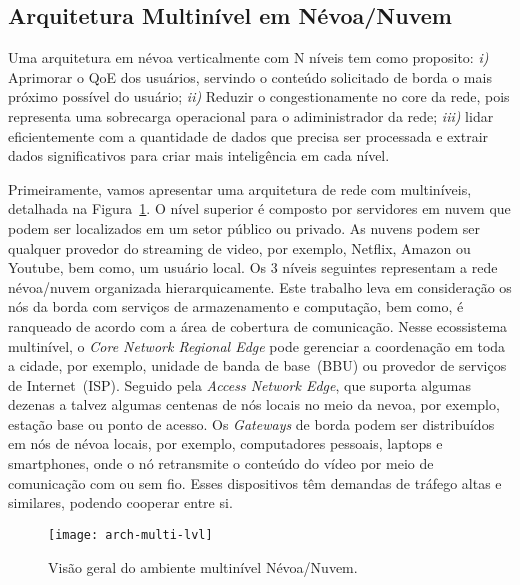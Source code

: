 \subsection{Arquitetura Multinível em Névoa/Nuvem}


Uma arquitetura em névoa verticalmente com N níveis tem como proposito: 
\textit{i)} Aprimorar o QoE dos usuários, servindo o conteúdo solicitado de borda o mais próximo possível do usuário;
\textit{ii)} Reduzir o congestionamente no core da rede, pois representa uma sobrecarga operacional para o adiministrador da rede;
\textit{iii)} lidar eficientemente com a quantidade de dados que precisa ser processada e extrair dados significativos para criar mais inteligência em cada nível. 
%

Primeiramente, vamos apresentar uma arquitetura de rede com multiníveis, detalhada na Figura~\ref{fig:arch-multi-lvl}. O nível superior é composto por servidores em nuvem que podem ser localizados em um setor público ou privado. As nuvens podem ser qualquer provedor do streaming de video, por exemplo, Netflix, Amazon ou Youtube, bem como, um usuário local. %
Os 3 níveis seguintes representam a rede névoa/nuvem organizada hierarquicamente. Este  trabalho leva em consideração os nós da borda com serviços de armazenamento e computação, bem como, é ranqueado de acordo com a área de cobertura de comunicação. Nesse ecossistema multinível, o \textit{Core Network Regional Edge} pode gerenciar a coordenação em toda a cidade, por exemplo, unidade de banda de base~(BBU) ou provedor de serviços de Internet~(ISP). Seguido pela \textit{Access Network Edge}, que suporta algumas dezenas a talvez algumas centenas de nós locais no meio da nevoa, por exemplo, estação base ou ponto de acesso. Os \textit{Gateways} de borda podem ser distribuídos em nós de névoa locais, por exemplo, computadores pessoais, laptops e smartphones, onde o nó retransmite o conteúdo do vídeo por meio de comunicação com ou sem fio. Esses dispositivos têm demandas de tráfego altas e similares, podendo cooperar entre si.%
\vspace{0.8cm}
\begin{figure}[htb]
  \centering
  \texttt{[image: arch-multi-lvl]}
  \caption{Visão geral do ambiente multinível Névoa/Nuvem.}
  \label{fig:arch-multi-lvl}
\end{figure}

